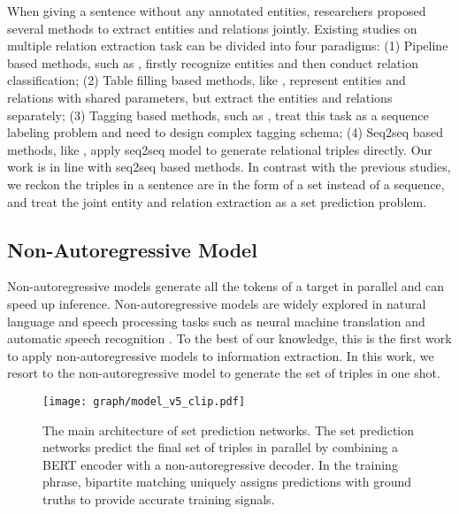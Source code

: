\documentclass[letterpaper]{article} \usepackage{aaai21}  \usepackage{times}  \usepackage{helvet} \usepackage{courier}  \usepackage[hyphens]{url}  \usepackage{graphicx} \usepackage{amsfonts,amssymb}
\begin{document}
When giving a sentence without any annotated entities, researchers proposed several methods to extract entities and relations jointly. Existing studies on multiple relation extraction
task can be divided into four paradigms: (1) Pipeline based methods, such as \citet{zelenko2003kernel,chan2011exploiting}, firstly recognize entities and then conduct relation classification; (2) Table filling based methods, like \citet{miwa2016end,gupta2016table,zhang2017end}, represent entities and relations with shared parameters, but extract the entities and relations separately; (3) Tagging based methods, such as \citet{zheng2017joint,dai2019joint,wei-etal-2020-novel}, treat this task as a sequence labeling problem and need to design complex tagging schema; (4) Seq2seq based methods, like \citet{zeng2018extracting,zeng2019learning,nayak2019ptrnetdecoding,zeng2020copymtl}, 
apply seq2seq model to generate relational triples directly. Our work is in line with seq2seq based methods.  In contrast with the previous studies, we reckon the triples in a sentence are in the form of a set instead of a sequence, and treat the joint entity and relation extraction as a set prediction problem.

\subsection{Non-Autoregressive Model}
Non-autoregressive models \cite{gu2018non,lee2018deterministic, ma-etal-2019-flowseq} generate all the tokens of a target in parallel and can speed up inference. Non-autoregressive models are widely explored in natural language and speech processing tasks such as neural machine translation \cite{gu2018non} and automatic speech recognition \cite{chen2019non}. To the best of our knowledge, this is the first work to apply non-autoregressive models to information extraction. In this work, we resort to the 
non-autoregressive model to generate the set of triples in one shot.




\begin{figure*}[t]
  	\begin{center} \texttt{[image: graph/model\_v5\_clip.pdf]}
  	\caption{The main architecture of set prediction networks.
  	The set prediction networks predict the final set of triples in parallel by combining a BERT encoder with a non-autoregressive decoder. In the training phrase, bipartite matching uniquely assigns predictions with ground truths to provide accurate training signals.
  	} \label{fig}
  \end{center}
  \end{figure*}
\end{document}
